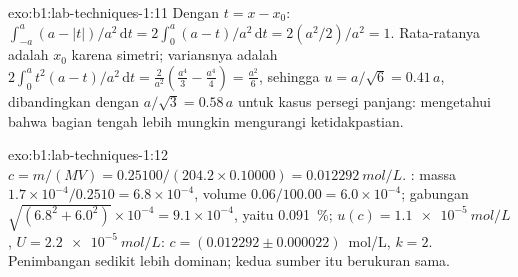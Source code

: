 \begin{solution}{exo:b1:lab-techniques-1:11}
Dengan $t = x - x_0$: $\int_{-a}^{a} (a - |t|)/a^2 \,\mathrm{d}t =
2 \int_0^a (a - t)/a^2 \,\mathrm{d}t = 2 (a^2/2)/a^2 = 1$. Rata-ratanya
adalah
$x_0$ karena simetri; variansnya adalah $2 \int_0^a t^2 (a - t)/a^2
\,\mathrm{d}t = \frac{2}{a^2}\left(\frac{a^4}{3} - \frac{a^4}{4}\right) =
\frac{a^2}{6}$, sehingga $u = a/\sqrt6 = 0.41\,a$, dibandingkan dengan $a/\sqrt3 = 0.58\,a$
untuk kasus persegi panjang: mengetahui bahwa bagian tengah lebih
mungkin mengurangi ketidakpastian.
\end{solution}

\begin{solution}{exo:b1:lab-techniques-1:12}
$c = m/(MV) = 0.25100/(204.2 \times 0.10000) = \qty{0.012292}{mol/L}$.
: massa $1.7 \times 10^{-4}/0.2510 = 6.8 \times
10^{-4}$, volume $0.06/100.00 = 6.0 \times 10^{-4}$; gabungan
$\sqrt{(6.8^2 + 6.0^2)} \times 10^{-4} = 9.1 \times 10^{-4}$, yaitu
\qty{0.091}{\percent}; $u(c) = \qty{1.1e-5}{mol/L}$, $U = \qty{2.2e-5}{mol/L}$:
$c = (0.012292 \pm 0.000022)$~mol/L, $k = 2$. Penimbangan sedikit lebih
dominan; kedua sumber itu berukuran sama.
\end{solution}

